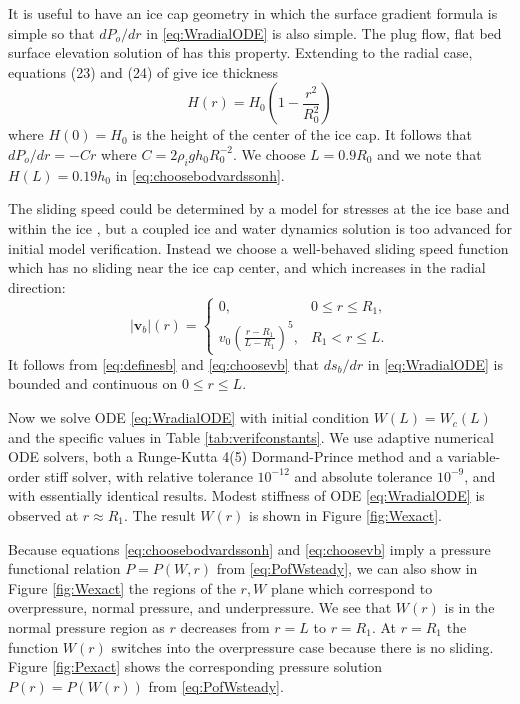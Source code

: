 \documentclass[gmd]{copernicus}   %
\newcommand\bv{\mathbf{v}}
\begin{document}
It is useful to have an ice cap geometry in which the surface gradient formula is simple so that $dP_o/dr$ in \eqref{eq:WradialODE} is also simple.  The plug flow, flat bed surface elevation solution of \cite{Bodvardsson} has this property.  Extending to the radial case, equations (23) and (24) of \citep{Bodvardsson} give ice thickness
\begin{equation}
H(r) = H_0 \left(1 - \frac{r^2}{R_0^2} \right) \label{eq:choosebodvardssonh}
\end{equation}
where $H(0)=H_0$ is the height of the center of the ice cap.  It follows that $dP_o/dr = - C r$ where $C=2\rho_i g h_0 R_0^{-2}$.  We choose $L=0.9 R_0$ and we note that $H(L)=0.19 h_0$ in \eqref{eq:choosebodvardssonh}.

The sliding speed could be determined by a model for stresses at the ice base and within the ice \citep{GreveBlatter2009}, but a coupled ice and water dynamics solution is too advanced for initial model verification.  Instead we choose a well-behaved sliding speed function which has no sliding near the ice cap center, and which increases in the radial direction:
\begin{equation}
|\bv_b|(r) = \begin{cases} 0, & 0 \le r \le R_1, \\
                           v_0  \left(\frac{r-R_1}{L-R_1}\right)^5, & R_1 < r \le L.
             \end{cases}  \label{eq:choosevb}
\end{equation}
It follows from \eqref{eq:definesb} and \eqref{eq:choosevb} that $ds_b/dr$ in \eqref{eq:WradialODE} is bounded and continuous on $0\le r \le L$.

Now we solve ODE \eqref{eq:WradialODE} with initial condition $W(L)=W_c(L)$ and the specific values in Table \ref{tab:verifconstants}.  We use adaptive numerical ODE solvers, both a Runge-Kutta 4(5) Dormand-Prince method and a variable-order stiff solver, with relative tolerance $10^{-12}$ and absolute tolerance $10^{-9}$, and with essentially identical results.  Modest stiffness \citep{AscherPetzold} of ODE \eqref{eq:WradialODE} is observed at $r\approx R_1$.  The result $W(r)$ is shown in Figure \ref{fig:Wexact}.

Because equations \eqref{eq:choosebodvardssonh} and \eqref{eq:choosevb} imply a pressure functional relation $P=P(W,r)$ from \eqref{eq:PofWsteady}, we can also show in Figure \ref{fig:Wexact} the regions of the $r,W$ plane which correspond to overpressure, normal pressure, and underpressure.  We see that $W(r)$ is in the normal pressure region as $r$ decreases from $r=L$ to $r=R_1$.  At $r=R_1$ the function $W(r)$ switches into the overpressure case because there is no sliding.  Figure \ref{fig:Pexact} shows the corresponding pressure solution $P(r)=P(W(r))$ from \eqref{eq:PofWsteady}.
\end{document}

